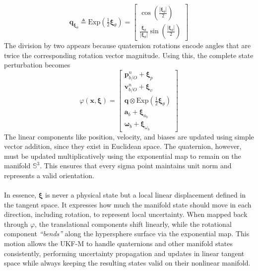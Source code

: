 $$
    \mathbf{q}_{\boldsymbol{\xi}_{\theta}} \triangleq 
    \mathrm{Exp}\left(\tfrac{1}{2}\boldsymbol{\xi}_{\theta}\right) =
    \begin{bmatrix}
        \cos\left(\tfrac{|\boldsymbol{\xi}_{\theta}|}{2}\right) \\
        \frac{\boldsymbol{\xi}_{\theta}}{|\boldsymbol{\xi}_{\theta}|}
        \sin\left(\tfrac{|\boldsymbol{\xi}_{\theta}|}{2}\right)
    \end{bmatrix}
$$
The division by two appears because quaternion rotations encode angles that are twice the corresponding rotation vector magnitude. Using this, the complete state perturbation becomes
$$
    \varphi(\mathbf{x}, \boldsymbol{\xi}) =
    \begin{bmatrix}
        \mathbf{p}_{b/O}^{n} + \boldsymbol{\xi}_{p} \\
        \mathbf{v}_{b/O}^{n} + \boldsymbol{\xi}_{v} \\
        \mathbf{q} \otimes \mathrm{Exp}\left(\tfrac{1}{2}\boldsymbol{\xi}_{\theta}\right) \\
        \mathbf{a}_b + \boldsymbol{\xi}_{a_b} \\
        \mathbf{\omega}_b + \boldsymbol{\xi}_{\omega_b}
    \end{bmatrix}
$$
The linear components like position, velocity, and biases are updated using simple vector addition, since they exist in Euclidean space. The quaternion, however, must be updated multiplicatively using the exponential map to remain on the manifold $\mathbb{S}^3$. This ensures that every sigma point maintains unit norm and represents a valid orientation.
\\ \\
In essence, $\boldsymbol{\xi}$ is never a physical state but a local linear displacement defined in the tangent space. It expresses how much the manifold state should move in each direction, including rotation, to represent local uncertainty. When mapped back through $\varphi$, the translational components shift linearly, while the rotational component \textit{``bends''} along the hypersphere surface via the exponential map. This motion allows the UKF-M to handle quaternions and other manifold states consistently, performing uncertainty propagation and updates in linear tangent space while always keeping the resulting states valid on their nonlinear manifold.

